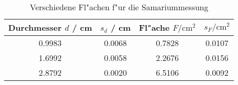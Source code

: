 \begin{table}[H]
\caption{Verschiedene Fl"achen f"ur die Samariummessung}
\begin{center}
\begin{tabular}{|c|c|c|c|}
  \hline
  Durchmesser $d$ / cm & $s_d$ / cm & Fl"ache $F / \text{cm}^2$ & $s_F / \text{cm}^2$ \\ \hline 
  0.9983 & 0.0068 & 0.7828 & 0.0107 \\ \hline
  1.6992 & 0.0058 & 2.2676 & 0.0156 \\ \hline
  2.8792 & 0.0020 & 6.5106 & 0.0092 \\ \hline
\end{tabular}
\end{center}
\label{tab:data:samarium:area}
\end{table}
